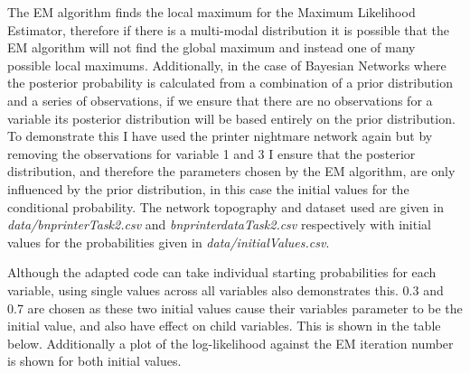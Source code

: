 \documentclass{article}
\begin{document}
The EM algorithm finds the local maximum for the Maximum Likelihood Estimator, therefore if there is a multi-modal distribution it is possible that the EM algorithm will not find the global maximum and instead one of many possible local maximums. Additionally, in the case of Bayesian Networks where the posterior probability is calculated from a combination of a prior distribution and a series of observations, if we ensure that there are no observations for a variable its posterior distribution will be based entirely on the prior distribution. To demonstrate this I have used the printer nightmare network again but by removing the observations for variable 1 and 3 I ensure that the posterior distribution, and therefore the parameters chosen by the EM algorithm, are only influenced by the prior distribution, in this case the initial values for the conditional probability. The network topography and dataset used are given in \textit{data/bnprinterTask2.csv} and \textit{bnprinterdataTask2.csv} respectively with initial values for the probabilities given in \textit{data/initialValues.csv}.

Although the adapted code can take individual starting probabilities for each variable, using single values across all variables also demonstrates this. 0.3 and 0.7 are chosen as these two initial values cause their variables parameter to be the initial value, and also have effect on child variables. This is shown in the table below. Additionally a plot of the log-likelihood against the EM iteration number is shown for both initial values.
\end{document}
